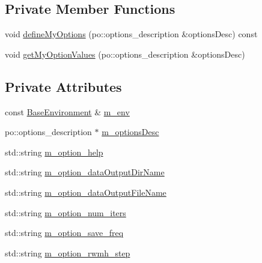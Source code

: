 \subsection*{Private Member Functions}
\begin{DoxyCompactItemize}
\item 
void \hyperlink{class_q_u_e_s_o_1_1_infinite_dimensional_m_c_m_c_sampler_options_a1feb71de843cebe5e1d7b6e49224986b}{define\-My\-Options} (po\-::options\-\_\-description \&options\-Desc) const 
\item 
void \hyperlink{class_q_u_e_s_o_1_1_infinite_dimensional_m_c_m_c_sampler_options_ace4a24a8b00672e231ea18e860875c53}{get\-My\-Option\-Values} (po\-::options\-\_\-description \&options\-Desc)
\end{DoxyCompactItemize}
\subsection*{Private Attributes}
\begin{DoxyCompactItemize}
\item 
const \hyperlink{class_q_u_e_s_o_1_1_base_environment}{Base\-Environment} \& \hyperlink{class_q_u_e_s_o_1_1_infinite_dimensional_m_c_m_c_sampler_options_a798627198e7d75723bd48d123835503c}{m\-\_\-env}
\item 
po\-::options\-\_\-description $\ast$ \hyperlink{class_q_u_e_s_o_1_1_infinite_dimensional_m_c_m_c_sampler_options_af3c175cdb1ed25be98ccee045b011b1f}{m\-\_\-options\-Desc}
\item 
std\-::string \hyperlink{class_q_u_e_s_o_1_1_infinite_dimensional_m_c_m_c_sampler_options_a897fdd1438ecdd2cd9efe5b1abad55ba}{m\-\_\-option\-\_\-help}
\item 
std\-::string \hyperlink{class_q_u_e_s_o_1_1_infinite_dimensional_m_c_m_c_sampler_options_a75dac93b87f4e93ffef95b35c7382ad2}{m\-\_\-option\-\_\-data\-Output\-Dir\-Name}
\item 
std\-::string \hyperlink{class_q_u_e_s_o_1_1_infinite_dimensional_m_c_m_c_sampler_options_a4c405def589baa661b5e76f0ca0ef280}{m\-\_\-option\-\_\-data\-Output\-File\-Name}
\item 
std\-::string \hyperlink{class_q_u_e_s_o_1_1_infinite_dimensional_m_c_m_c_sampler_options_ab27e1a612339e516eb32b326e1dd6ed5}{m\-\_\-option\-\_\-num\-\_\-iters}
\item 
std\-::string \hyperlink{class_q_u_e_s_o_1_1_infinite_dimensional_m_c_m_c_sampler_options_ac2ebcd1aff902c0b01fec2366fe775b6}{m\-\_\-option\-\_\-save\-\_\-freq}
\item 
std\-::string \hyperlink{class_q_u_e_s_o_1_1_infinite_dimensional_m_c_m_c_sampler_options_aa76584eb25581942458195d26e032578}{m\-\_\-option\-\_\-rwmh\-\_\-step}
\end{DoxyCompactItemize}


